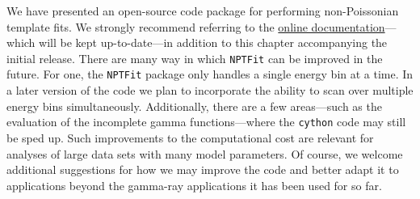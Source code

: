 We have presented an open-source code package for performing non-Poissonian template fits.   We strongly recommend referring to the \href{http://nptfit.readthedocs.io}{online documentation}---which will be kept up-to-date---in addition to this chapter accompanying the initial release.  There are many way in which \texttt{NPTFit} can be improved in the future.  For one, the  \texttt{NPTFit} package only handles a single energy bin at a time.  In a later version of the code we plan to incorporate the ability to scan over multiple energy bins simultaneously.  Additionally, there are a few areas---such as the evaluation of the incomplete gamma functions---where the \texttt{cython} code may still be sped up.  Such improvements to the computational cost are relevant for analyses of large data sets with many model parameters.  Of course, we welcome additional suggestions for how we may improve the code and better adapt it to applications beyond the gamma-ray applications it has been used for so far. 

\sectionline

